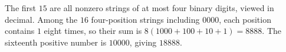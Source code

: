 The first $15$ are all nonzero strings of at most four binary digits, viewed in decimal. Among the $16$ four-position strings including $0000$, each position contains $1$ eight times, so their sum is $8(1000+100+10+1)=8888$. The sixteenth positive number is $10000$, giving $\boxed{18888}$.
